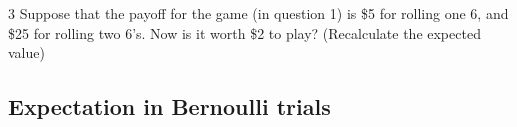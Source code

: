 \documentclass[a4paper,12pt]{book}
\newcounter{question}
\begin{document}
        \begin{question}{\thequestion}{3}
            Suppose that the payoff for the game (in question 1) is \$5
            for rolling one 6, and \$25 for rolling two 6's. Now is it worth \$2 to play?
            (Recalculate the expected value)

        \end{question}

        \newpage

        \subsection{Expectation in Bernoulli trials}
\end{document}
